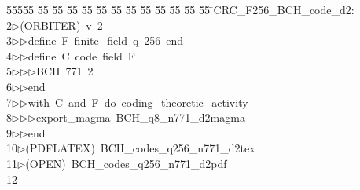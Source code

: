 %
%
\begin{tabbing}
55555 \= 55 \= 55 \= 55 \= 55 \= 55 \= 55 \= 55 \= 55 \= 55 \= 55 \= 55 \= 55 \= \>CRC\_F256\_BCH\_code\_d2:\\[0pt]
2\>$\triangleright$\>(ORBITER)\ v\ 2\ \\[0pt]
3\>$\triangleright$\>$\triangleright$\>define\ F\ finite\_field\ q\ 256\ end\ \\[0pt]
4\>$\triangleright$\>$\triangleright$\>define\ C\ code\ field\ F\ \\[0pt]
5\>$\triangleright$\>$\triangleright$\>$\triangleright$\>BCH\ 771\ 2\ \\[0pt]
6\>$\triangleright$\>$\triangleright$\>end\ \\[0pt]
7\>$\triangleright$\>$\triangleright$\>with\ C\ and\ F\ do\ coding\_theoretic\_activity\ \\[0pt]
8\>$\triangleright$\>$\triangleright$\>$\triangleright$\>export\_magma\ BCH\_q8\_n771\_d2magma\ \\[0pt]
9\>$\triangleright$\>$\triangleright$\>end\\[0pt]
10\>$\triangleright$\>(PDFLATEX)\ BCH\_codes\_q256\_n771\_d2tex\\[0pt]
11\>$\triangleright$\>(OPEN)\ BCH\_codes\_q256\_n771\_d2pdf\\[0pt]
12\>\end{tabbing}
